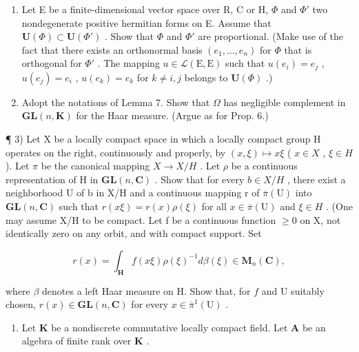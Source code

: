 \exercisesection{}

\begin{enumerate}
\def\labelenumi{\arabic{enumi})}
\item
  Let E be a finite-dimensional vector space over R, C or H, \(\Phi\) and \(\Phi'\) two nondegenerate positive hermitian forms on E. Assume that \(\mathbf{U}(\Phi) \subset \mathbf{U}(\Phi')\) . Show that \(\Phi\) and \(\Phi'\) are proportional. (Make use of the fact that there exists an orthonormal basis \((e_{1}, \ldots, e_{n})\) for \(\Phi\) that is orthogonal for \(\Phi'\) . The mapping \(u \in \mathcal{L}(\mathrm{E}, \mathrm{E})\) such that \(u(e_{i}) = e_{j}\) , \(u(e_{j}) = e_{i}\) , \(u(e_{k}) = e_{k}\) for \(k \neq i, j\) belongs to \(\mathbf{U}(\Phi)\) .)
\item
  Adopt the notations of Lemma 7. Show that \(\Omega\) has negligible complement in \(\mathbf{GL}(n,\mathbf{K})\) for the Haar measure. (Argue as for Prop. 6.)
\end{enumerate}

¶ 3) Let X be a locally compact space in which a locally compact group H operates on the right, continuously and properly, by \((x,\xi)\mapsto x\xi\) ( \(x\in X\) , \(\xi\in H\) ). Let \(\pi\) be the canonical mapping \(X\to X/H\) . Let \(\rho\) be a continuous representation of H in \(\mathbf{GL}(n,\mathbf{C})\) . Show that for every \(b\in X/H\) , there exist a neighborhood U of b in X/H and a continuous mapping r of \(\overline{\pi}(\mathrm{U})\) into \(\mathbf{GL}(n,\mathbf{C})\) such that \(r(x\xi)=r(x)\rho(\xi)\) for all \(x\in\overline{\pi}(\mathrm{U})\) and \(\xi\in H\) . (One may assume X/H to be compact. Let f be a continuous function \(\geqslant0\) on X, not identically zero on any orbit, and with compact support. Set

\[
r (x) = \int_ {\mathbf {H}} f (x \xi) \rho (\xi) ^ {- 1} d \beta (\xi) \in \mathbf {M} _ {n} (\mathbf {C}),
\]

where \(\beta\) denotes a left Haar measure on H. Show that, for \(f\) and U suitably chosen, \(r(x) \in \mathbf{GL}(n, \mathbf{C})\) for every \(x \in \overline{\pi}^1(\mathrm{U})\) .

\begin{enumerate}
\def\labelenumi{\arabic{enumi})}
\setcounter{enumi}{3}
\tightlist
\item
  Let \(\mathbf{K}\) be a nondiscrete commutative locally compact field. Let \(\mathbf{A}\) be an algebra of finite rank over \(\mathbf{K}\) .
\end{enumerate}

